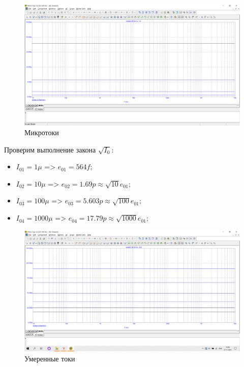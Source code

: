 \documentclass[a4paper, 12pt]{article}%
\begin{document}
\begin{figure}[h!]
    \centering
    \includegraphics[scale = 0.4 \textwidth]{images/mod2_1_1.png}
    \caption{Микротоки}
    \label{fig:m211}
\end{figure}

Проверим выполнение закона $\sqrt{I_0}$:
\begin{itemize}
    \item $I_{01} = 1\mu$ => $e_{01} = 564f$;
    \item $I_{02} = 10\mu$ => $e_{02} = 1.69p \approx \sqrt{10}e_{01}$;
    \item $I_{03} = 100\mu$ => $e_{03} = 5.603p \approx \sqrt{100}e_{01}$; 
    \item $I_{04} = 1000\mu$ => $e_{04} = 17.79p \approx \sqrt{1000}e_{01}$;
\end{itemize}

\begin{figure}[h!]
    \centering
    \includegraphics[scale = 0.4 \textwidth]{images/mod2_1_2.png}
    \caption{Умеренные токи}
    \label{fig:m212}
\end{figure}
\end{document}
